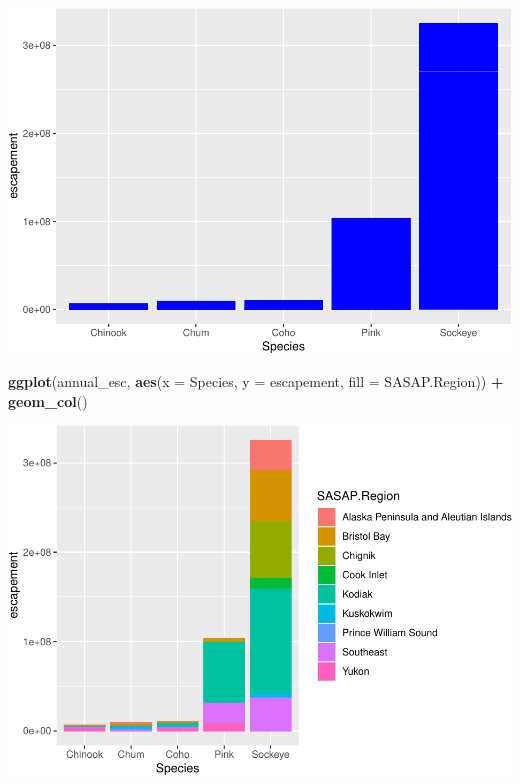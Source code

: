 \documentclass[]{article}
\newenvironment{Shaded}{\begin{snugshade}}{\end{snugshade}}
\newcommand{\DataTypeTok}[1]{\textcolor[rgb]{0.13,0.29,0.53}{#1}}
\newcommand{\KeywordTok}[1]{\textcolor[rgb]{0.13,0.29,0.53}{\textbf{#1}}}
\newcommand{\NormalTok}[1]{#1}
\newcommand{\OperatorTok}[1]{\textcolor[rgb]{0.81,0.36,0.00}{\textbf{#1}}}
\newcommand{\StringTok}[1]{\textcolor[rgb]{0.31,0.60,0.02}{#1}}
\begin{document}
\includegraphics{Rmarkdown_files/figure-latex/unnamed-chunk-6-1.pdf}

\begin{Shaded}
\begin{Highlighting}[]
\KeywordTok{ggplot}\NormalTok{(annual_esc, }\KeywordTok{aes}\NormalTok{(}\DataTypeTok{x =}\NormalTok{ Species, }\DataTypeTok{y =}\NormalTok{ escapement, }\DataTypeTok{fill =}\NormalTok{ SASAP.Region)) }\OperatorTok{+}
\StringTok{  }\KeywordTok{geom_col}\NormalTok{()}
\end{Highlighting}
\end{Shaded}

\includegraphics{Rmarkdown_files/figure-latex/unnamed-chunk-7-1.pdf}
\end{document}
